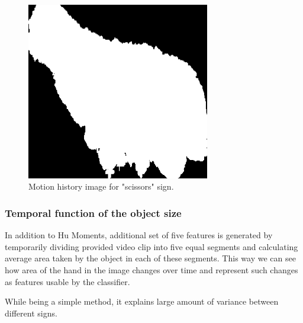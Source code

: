 \begin{figure}
\begin{center}
\includegraphics[width=80mm]{mhi_scissors.png}
\caption{Motion history image for "scissors" sign.}
\label{fig:mhis}
\end{center}
\end{figure}

\subsubsection*{Temporal function of the object size}

In addition to Hu Moments, additional set of five features is generated by temporarily dividing provided video clip into five equal segments and calculating average area taken by the object in each of these segments. This way we can see how area of the hand in the image changes over time and represent such changes as features usable by the classifier. 

While being a simple method, it explains large amount of variance between different signs. 